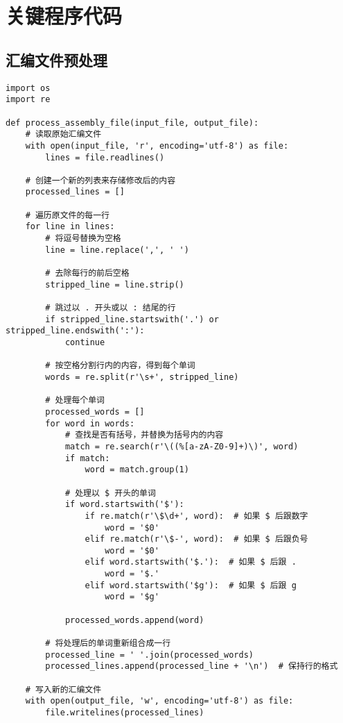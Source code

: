 
\section*{关键程序代码}
\vspace*{1cm}
\subsection*{汇编文件预处理}
\begin{lstlisting}
import os
import re

def process_assembly_file(input_file, output_file):
    # 读取原始汇编文件
    with open(input_file, 'r', encoding='utf-8') as file:
        lines = file.readlines()

    # 创建一个新的列表来存储修改后的内容
    processed_lines = []

    # 遍历原文件的每一行
    for line in lines:
        # 将逗号替换为空格
        line = line.replace(',', ' ')

        # 去除每行的前后空格
        stripped_line = line.strip()

        # 跳过以 . 开头或以 : 结尾的行
        if stripped_line.startswith('.') or stripped_line.endswith(':'):
            continue

        # 按空格分割行内的内容，得到每个单词
        words = re.split(r'\s+', stripped_line)

        # 处理每个单词
        processed_words = []
        for word in words:
            # 查找是否有括号，并替换为括号内的内容
            match = re.search(r'\((%[a-zA-Z0-9]+)\)', word)
            if match:
                word = match.group(1)

            # 处理以 $ 开头的单词
            if word.startswith('$'):
                if re.match(r'\$\d+', word):  # 如果 $ 后跟数字
                    word = '$0'
                elif re.match(r'\$-', word):  # 如果 $ 后跟负号
                    word = '$0'
                elif word.startswith('$.'):  # 如果 $ 后跟 .
                    word = '$.'
                elif word.startswith('$g'):  # 如果 $ 后跟 g
                    word = '$g'

            processed_words.append(word)

        # 将处理后的单词重新组合成一行
        processed_line = ' '.join(processed_words)
        processed_lines.append(processed_line + '\n')  # 保持行的格式

    # 写入新的汇编文件
    with open(output_file, 'w', encoding='utf-8') as file:
        file.writelines(processed_lines)



\end{lstlisting}
